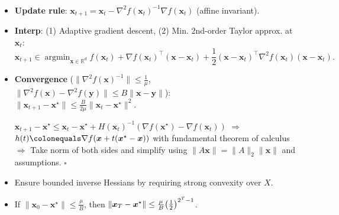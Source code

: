 \documentclass[8pt,a4paper]{extarticle}
\renewcommand{\proof}[1]{\begin{tcolorbox}#1 \hfill $\square$\end{tcolorbox}}
\DeclareMathOperator*{\argmin}{argmin}
\newcommand{\lft}{\mathopen{}\mathclose\bgroup\left}
\newcommand{\rgt}{\aftergroup\egroup\right}
\newcommand{\R}{\mathbb{R}}
\renewcommand{\vec}[1]{\bm{#1}}
\newcommand{\mat}[1]{#1}
\newenvironment{topic}[1]
{\textbf{\sffamily \colorbox{black}{\rlap{\textbf{\textcolor{white}{#1}}}\hspace{\linewidth}\hspace{-2\fboxsep}}} \\ \vspace{0.2cm}}
{}
\begin{document}
\begin{multicols*}{2}
    \begin{topic}{Newton's method}
        \begin{itemize}
            \item \textbf{Update rule}: $\vec{x}_{t+1} = \vec{x}_t - \nabla^2 f(\vec{x}_t)^{-1} \nabla f(\vec{x}_t)$ (affine invariant).
            \item \textbf{Interp}: (1) Adaptive gradient descent, (2) Min. 2nd-order Taylor approx. at $\vec{x}_t$: \[
                      \vec{x}_{t+1} \in \argmin_{\vec{x} \in \R^d} f(\vec{x}_t) + \nabla f(\vec{x}_t)^\top (\vec{x} - \vec{x}_t) + \frac{1}{2} (\vec{x} - \vec{x}_t)^\top \nabla^2 f(\vec{x}_t) (\vec{x} - \vec{x}_t).
                  \]
            \item \textbf{Convergence} ($\| \nabla^2 f(\vec{x})^{-1} \| \leq \frac{1}{\mu}$, $\| \nabla^2 f(\vec{x}) - \nabla^2 f(\vec{y}) \| \leq B \| \vec{x} - \vec{y} \|$): \\
                  $\| \vec{x}_{t+1} - \vec{x}^\star \| \leq \frac{B}{2 \mu} \| \vec{x}_t - \vec{x}^\star \|^2$.
                  \proof{$\vec{x}_{t+1} - \vec{x}^\star \leq \vec{x}_t - \vec{x}^\star +
                          H(\vec{x}_t)^{-1} (\nabla f(\vec{x}^\star) - \nabla f(\vec{x}_t))$ $\Rightarrow$
                      $h(t) \colonequals \nabla f(\vec{x} + t(\vec{x}^\star - \vec{x}))$ with fundamental theorem
                      of calculus $\Rightarrow$ Take norm of both sides and simplify using $\| \mat{A}
                          \vec{x} \| = \| \mat{A} \|_2 \| \vec{x} \|$ and assumptions.}
            \item Ensure bounded inverse Hessians by requiring strong convexity over $X$.
            \item If $\| \vec{x}_0 - \vec{x}^\star \| \leq \frac{\mu}{B}$, then $\| \vec{x}_T - \vec{x}^\star \| \leq
                      \frac{\mu}{B} \lft( \frac{1}{2} \rgt)^{2^T - 1}$.

        \end{itemize}
    \end{topic}


\end{multicols*}
\end{document}
